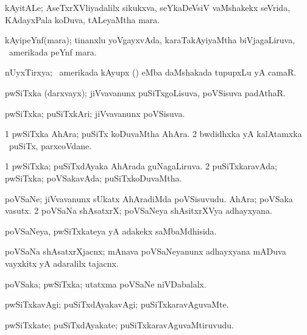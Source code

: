 \bentry
{}
\gl{\nA}
\bmng
kAyitALe; AseTxrXVliyadalilx sikukxva, seYkaDeVsiV vaMshakekx seVrida, KAdayxPala koDuva, tALeyaMtha mara. 
\emng
\eentry

\bentry
{}
\gl{\nA}
\bmng
kAyipeYnf(mara); tinanxlu yoVgayxvAda, karaTakAyiyaMtha biVjagaLiruva, \kanu\ amerikada peYnf mara. 
\emng
\eentry

\bentry
{}
\gl{\nA}
\bmng
nUyxTirxya; \da\ amerikada kAyupx () eMba daMshakada tupupxLu yA camaR. 
\emng
\eentry

\bentry
{}
\gl{\nA}
\bmng
pwSiTxka (darxvayx); jiVvavanunx puSiTxgoLisuva, poVSisuva padAthaR. 
\emng
\eentry

\bentry
{}
\gl{\gu}
\bmng
pwSiTxka; puSiTxkAri; jiVvavanunx poVSisuva. 
\emng
\eentry

\bentry
{}
\gl{\nA}
\bmng
\bnum
\num{1} pwSiTxka AhAra; puSiTx koDuvaMtha AhAra. 
\num{2} bwdidhxka yA kalAtamxka \mo\ puSiTx, parxcoVdane. 
\enum
\emng
\eentry

\bentry
{}
\gl{\gu}
\bmng
\bnum
\num{1} pwSiTxka; puSiTxdAyaka AhArada guNagaLiruva. 
\num{2} puSiTxkaravAda; pwSiTxka; poVSakavAda; puSiTxkoDuvaMtha. 
\enum
\emng
\eentry

\bentry
{}
\gl{\nA}
\bmng
\bnum
{} 
\banum
{} poVSaNe; jiVvavanunx sUkatx AhAradiMda poVSisuvudu. 
 AhAra; poVSaka vasutx. 
\eanum
\numie
\num{2} poVSaNa shAsatxrX; poVSaNeya shAsitxrXVya adhayxyana. 
\enum
\emng
\eentry

\bentry
{}
\gl{\gu}
\bmng
poVSaNeya, pwSiTxkateya yA adakekx saMbaMdhisida. 
\emng
\eentry

\bentry
{}
\gl{\nA}
\bmng
poVSaNa shAsatxrXjacnx; mAnava poVSaNeyanunx adhayxyana mADuva vayxkitx yA adaralilx tajacnx. 
\emng
\eentry

\bentry
{}
\gl{\gu}
\bmng
poVSaka; pwSiTxka; utatxma poVSaNe niVDabalalx. 
\emng
\eentry

\bentry
{}
\gl{\kirxvi}
\bmng
pwSiTxkavAgi; puSiTxdAyakavAgi; puSiTxkaravAguvaMte. 
\emng
\eentry

\bentry
{}
\gl{\nA}
\bmng
pwSiTxkate; puSiTxdAyakate; puSiTxkaravAguvaMtiruvudu. 
\emng
\eentry

